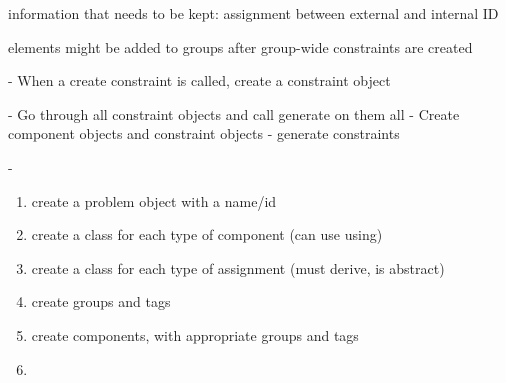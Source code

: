 information that needs to be kept: assignment between external and internal ID

elements might be added to groups after group-wide constraints are created

- When a create constraint is called, create a constraint object

- Go through all constraint objects and call generate on them all
- Create component objects and constraint objects
- generate constraints

-

\begin{enumerate}
\item create a problem object with a name/id
\item create a class for each type of component (can use using)
\item create a class for each type of assignment (must derive, is abstract)
\item create groups and tags
\item create components, with appropriate groups and tags
\item 
\end{enumerate}
